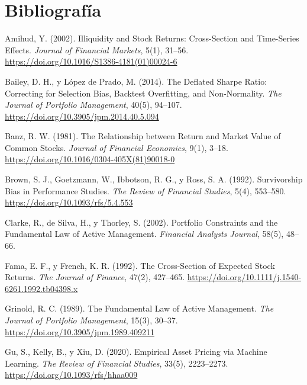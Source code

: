 \chapter{Bibliografía}
\label{chap:bibliografia}

\begin{list}{}{%
  \setlength{\leftmargin}{2em}%
  \setlength{\itemindent}{-2em}%
  \setlength{\itemsep}{0.55em}%
  \setlength{\parsep}{0pt}%
}

\item Amihud, Y. (2002). Illiquidity and Stock Returns: Cross-Section and Time-Series Effects.
  \textit{Journal of Financial Markets}, 5(1), 31--56.
  \url{https://doi.org/10.1016/S1386-4181(01)00024-6}

\item Bailey, D. H., y López de Prado, M. (2014). The Deflated Sharpe Ratio: Correcting for
  Selection Bias, Backtest Overfitting, and Non-Normality.
  \textit{The Journal of Portfolio Management}, 40(5), 94--107.
  \url{https://doi.org/10.3905/jpm.2014.40.5.094}

\item Banz, R. W. (1981). The Relationship between Return and Market Value of Common Stocks.
  \textit{Journal of Financial Economics}, 9(1), 3--18.
  \url{https://doi.org/10.1016/0304-405X(81)90018-0}

\item Brown, S. J., Goetzmann, W., Ibbotson, R. G., y Ross, S. A. (1992). Survivorship Bias in
  Performance Studies. \textit{The Review of Financial Studies}, 5(4), 553--580.
  \url{https://doi.org/10.1093/rfs/5.4.553}

\item Clarke, R., de Silva, H., y Thorley, S. (2002). Portfolio Constraints and the Fundamental Law
  of Active Management. \textit{Financial Analysts Journal}, 58(5), 48--66.

\item Fama, E. F., y French, K. R. (1992). The Cross-Section of Expected Stock Returns.
  \textit{The Journal of Finance}, 47(2), 427--465.
  \url{https://doi.org/10.1111/j.1540-6261.1992.tb04398.x}

\item Grinold, R. C. (1989). The Fundamental Law of Active Management.
  \textit{The Journal of Portfolio Management}, 15(3), 30--37.
  \url{https://doi.org/10.3905/jpm.1989.409211}

\item Gu, S., Kelly, B., y Xiu, D. (2020). Empirical Asset Pricing via Machine Learning.
  \textit{The Review of Financial Studies}, 33(5), 2223--2273.
  \url{https://doi.org/10.1093/rfs/hhaa009}


\end{list}
